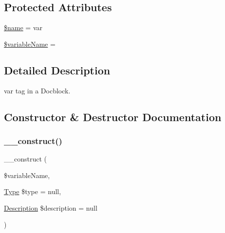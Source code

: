 \subsection*{Protected Attributes}
\begin{DoxyCompactItemize}
\item 
\mbox{\hyperlink{classphp_documentor_1_1_reflection_1_1_doc_block_1_1_tags_1_1_var___ab2fc40d43824ea3e1ce5d86dee0d763b}{\$name}} = \textquotesingle{}var\textquotesingle{}
\item 
\mbox{\hyperlink{classphp_documentor_1_1_reflection_1_1_doc_block_1_1_tags_1_1_var___a34a81eb3c92d37d458c6d18032faee7e}{\$variable\+Name}} = \textquotesingle{}\textquotesingle{}
\end{DoxyCompactItemize}


\subsection{Detailed Description}
var tag in a Docblock. 

\subsection{Constructor \& Destructor Documentation}
\mbox{\label{classphp_documentor_1_1_reflection_1_1_doc_block_1_1_tags_1_1_var___a1e5de5b31a43e9ffe064e27942aa5e63}} 
\subsubsection{\texorpdfstring{\+\_\+\+\_\+construct()}{\_\_construct()}}
{\footnotesize\ttfamily \+\_\+\+\_\+construct (\begin{DoxyParamCaption}\item[{}]{\$variable\+Name,  }\item[{\mbox{\hyperlink{interfacephp_documentor_1_1_reflection_1_1_type}{Type}}}]{\$type = {\ttfamily null},  }\item[{\mbox{\hyperlink{classphp_documentor_1_1_reflection_1_1_doc_block_1_1_description}{Description}}}]{\$description = {\ttfamily null} }\end{DoxyParamCaption})}


